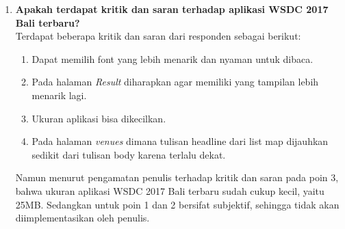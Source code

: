 \begin{enumerate}
	\item \textbf{Apakah terdapat kritik dan saran terhadap aplikasi WSDC 2017 Bali terbaru?} \\
	Terdapat beberapa kritik dan saran dari responden sebagai berikut:
	\begin{enumerate}
		\item Dapat memilih font yang lebih menarik dan nyaman untuk dibaca.
		\item Pada halaman \textit{Result} diharapkan agar memiliki yang tampilan lebih menarik lagi.
		\item Ukuran aplikasi bisa dikecilkan.
		\item Pada halaman \textit{venues} dimana tulisan headline dari list map dijauhkan sedikit dari tulisan body karena terlalu dekat.
	\end{enumerate}
		Namun menurut pengamatan penulis terhadap kritik dan saran pada poin 3, bahwa ukuran aplikasi WSDC 2017 Bali terbaru sudah cukup kecil, yaitu 25MB. Sedangkan untuk poin 1 dan 2 bersifat subjektif, sehingga tidak akan diimplementasikan oleh penulis.

\end{enumerate}
